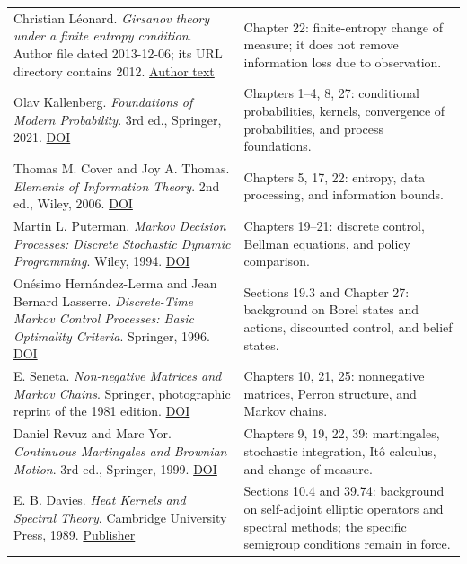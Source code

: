 \documentclass[
  english,
  11pt,
  oneside]{book}
\begin{document}
{\begin{longtable}[]{@{}
  >{\raggedright\arraybackslash}p{}
  >{\raggedright\arraybackslash}p{}@{}}
Christian Léonard. \emph{Girsanov theory under a finite entropy condition}. Author file dated 2013-12-06; its URL directory contains 2012. \href{https://leonard.perso.math.cnrs.fr/papers/2012-Leonard-Girsanov\%20theory\%20under\%20a\%20finite\%20entropy\%20condition.pdf}{Author text} & Chapter 22: finite-entropy change of measure; it does not remove information loss due to observation. \\
Olav Kallenberg. \emph{Foundations of Modern Probability}. 3rd ed., Springer, 2021. \href{https://doi.org/10.1007/978-3-030-61871-1}{DOI} & Chapters 1--4, 8, 27: conditional probabilities, kernels, convergence of probabilities, and process foundations. \\
Thomas M. Cover and Joy A. Thomas. \emph{Elements of Information Theory}. 2nd ed., Wiley, 2006. \href{https://doi.org/10.1002/047174882X}{DOI} & Chapters 5, 17, 22: entropy, data processing, and information bounds. \\
Martin L. Puterman. \emph{Markov Decision Processes: Discrete Stochastic Dynamic Programming}. Wiley, 1994. \href{https://doi.org/10.1002/9780470316887}{DOI} & Chapters 19--21: discrete control, Bellman equations, and policy comparison. \\
Onésimo Hernández-Lerma and Jean Bernard Lasserre. \emph{Discrete-Time Markov Control Processes: Basic Optimality Criteria}. Springer, 1996. \href{https://doi.org/10.1007/978-1-4612-0729-0}{DOI} & Sections 19.3 and Chapter 27: background on Borel states and actions, discounted control, and belief states. \\
E. Seneta. \emph{Non-negative Matrices and Markov Chains}. Springer, photographic reprint of the 1981 edition. \href{https://doi.org/10.1007/0-387-32792-4}{DOI} & Chapters 10, 21, 25: nonnegative matrices, Perron structure, and Markov chains. \\
Daniel Revuz and Marc Yor. \emph{Continuous Martingales and Brownian Motion}. 3rd ed., Springer, 1999. \href{https://doi.org/10.1007/978-3-662-06400-9}{DOI} & Chapters 9, 19, 22, 39: martingales, stochastic integration, Itô calculus, and change of measure. \\
E. B. Davies. \emph{Heat Kernels and Spectral Theory}. Cambridge University Press, 1989. \href{https://www.cambridge.org/core/books/heat-kernels-and-spectral-theory/39DC7EE2A5DCCE9DEF581D2F52A73E1F}{Publisher} & Sections 10.4 and 39.74: background on self-adjoint elliptic operators and spectral methods; the specific semigroup conditions remain in force. \\

\end{longtable}}
\end{document}
